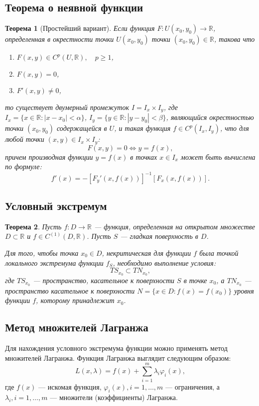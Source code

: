 \documentclass[12pt]{report}
\theoremstyle{plain}
\newtheorem{theorem}{Теорема}[chapter]
\newcommand{\R}{\mathbb R}
\begin{document}
\subsection{Теорема о неявной функции}
\begin{theorem}[Простейший вариант]
Если функция $F: U(x_0, y_0) \rightarrow \R$, определенная в окрестности
точки $U(x_0, y_0)$ точки $(x_0, y_0) \in \R$, такова что
\begin{enumerate}
\item $F(x, y) \in C^p(U, \R),\quad p \ge 1$,
\item $F(x, y) = 0$,
\item $F'(x, y) \ne 0$,
\end{enumerate}
то существует двумерный промежуток $I = I_x \times I_y$, где
$I_x = \{x \in \R: |x - x_0| < \alpha\}$, $I_y = \{y \in \R: |y - y_0| < \beta\}$,
являющийся окрестностью точки $(x_0, y_0)$ содержащейся в $U$, и такая функция
$f \in C^p(I_x, I_y)$, что для любой точки $(x, y) \in I_x \times I_y$:
$$
F(x, y) = 0 \Leftrightarrow y = f(x),
$$
причем производная функции $y=f(x)$ в точках $x \in I_x$ может быть вычислена по формуле:
$$
f'(x) = -[F_y'(x, f(x))]^{-1} [F_x(x, f(x))].
$$
\end{theorem}

\subsection{Условный экстремум}
\begin{theorem}
Пусть $f: D \rightarrow \R$ --- функция, определенная на открытом множестве
$D \subset \R$ и $f \in C^{(1)}(D, \R)$. Пусть $S$ --- гладкая поверхность в
$D$.

Для того, чтобы точка $x_0 \in D$, некритическая для функции $f$ была точкой локального
экстремума функции $f_S$, необходимо выполнение условия:
$$
TS_{x_0} \subset TN_{x_0},
$$
где $TS_{x_0}$ --- пространство, касательное к поверхности $S$ в точке $x_0$, а
$TN_{x_0}$ --- пространство касательное к поверхности $N = \{ x \in D: f(x) = f(x_0) \}$
уровня функции $f$, которому принадлежит $x_0$.
\end{theorem}

\subsection{Метод множителей Лагранжа}
Для нахождения условного экстремума функции можно применять метод множителей
Лагранжа. Функция Лагранжа выглядит следующим образом:
$$
L(x, \lambda) = f(x) + \sum\limits_{i=1}^{m} \lambda_i \varphi_i(x),
$$
где $f(x)$ --- искомая функция, $\varphi_i(x), i = 1, \dots, m$ --- ограничения,
а $\lambda_i, i = 1, \dots, m$ --- множители (коэффициенты) Лагранжа.
\end{document}
